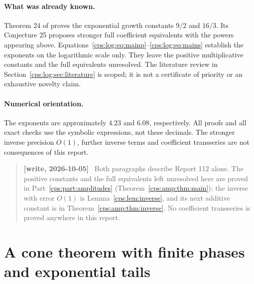 \documentclass[11pt,letterpaper]{article}
\numberwithin{equation}{section}
\theoremstyle{remark}\newtheorem{remark}[theorem]{Remark}
\newenvironment{writenotelog}{\begin{quote}\small\sloppy\textbf{[write, 2026-10-05]}\ }{\end{quote}}
\begin{document}
\paragraph{What was already known.}
Theorem 24 of \cite{FNS} proves the exponential growth constants $9/2$ and
$16/3$. Its Conjecture 25 proposes stronger full coefficient equivalents
with the powers appearing above. Equations~\eqref{cps:log:eq:mainp}--\eqref{cps:log:eq:mains}
establish the exponents on the logarithmic scale only. They leave the
positive multiplicative constants and the full equivalents unresolved.
The literature review in Section~\ref{cps:log:sec:literature} is scoped; it is not
a certificate of priority or an exhaustive novelty claim.

\paragraph{Numerical orientation.}
The exponents are approximately $4.23$ and $6.08$, respectively. All proofs
and all exact checks use the symbolic expressions, not these decimals.
The stronger inverse precision $O(1)$, further inverse terms and
coefficient transseries are not consequences of this report.

\begin{writenotelog}
Both paragraphs describe Report 112 alone. The positive constants and the full equivalents left
unresolved here are proved in Part~\ref{cps:part:amplitudes} (Theorem~\ref{cps:amp:thm:main}); the
inverse with error $O(1)$ is Lemma~\ref{cps:lem:inverse}, and its next additive constant is in
Theorem~\ref{cps:amp:thm:inverse}. No coefficient transseries is proved anywhere in this report.
\end{writenotelog}

\section{A cone theorem with finite phases and exponential tails}\label{cps:log:sec:cone}
\end{document}
